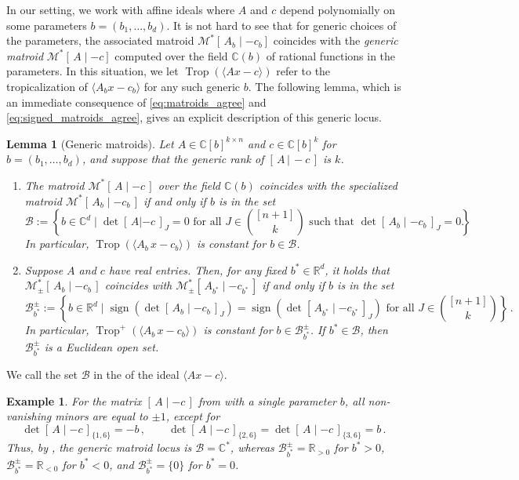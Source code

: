 \documentclass[11pt,reqno,a4paper]{amsart}
\numberwithin{equation}{section}
\theoremstyle{theoremstyle}
\newtheorem{lemma}[theorem]{Lemma}
\theoremstyle{examplestyle}
\newtheorem{example}[theorem]{Example}
\newcommand{\CC}{\mathbb{C}}
\newcommand{\RR}{\mathbb{R}}
\DeclareMathOperator{\Trop}{Trop}
\DeclareMathOperator{\sgn}{sign}
\newcommand{\term}{\bfemph}
\begin{document}
In our setting, we work with affine ideals where  $A$ and $c$ depend polynomially on some parameters $b=(b_1,\ldots,b_d)$. It is not hard to see that for generic choices of the parameters, the associated matroid $\mathcal{M}^*[\,A_b\mid -c_b]$ coincides with the \emph{generic matroid} $\mathcal{M}^*[\,A\mid -c]$ computed over the field $\CC(b)$ of rational functions in the parameters. 
In this situation, we let $\Trop(\langle Ax-c\rangle)$  refer to the tropicalization of $\langle A_bx-c_b\rangle$ for any such generic $b$. 
The following lemma, which is an immediate consequence of \eqref{eq:matroids_agree} and \eqref{eq:signed_matroids_agree}, gives an explicit description of this generic locus.


 
\begin{lemma}[Generic matroids]
\label{lem:genericMatroid}
Let $A\in \CC[b]^{k\times n}$ and $c\in\CC[b]^k$ for   $b=(b_1,\ldots, b_d)$, and suppose that the generic rank of $[\,A\,|\, -c\,]$ is $k$. 
\begin{enumerate}[label=(\roman*)]
    \item The matroid $\mathcal{M}^*[\,A\mid -c\,]$ over the field $\CC(b)$ coincides with the specialized matroid $\mathcal{M}^*[\,A_b\mid -c_b\,]$ if and only if $b$ is in the set
     \[ \mathcal{B}:= \left\{b\in\CC^d\mid \det [\,A| -c\,]_{J} = 0 \text{ for all $J\in\textstyle\binom{[n+1]}{k}$ such that } \det[\,A_b\mid -c_b\,]_{J} = 0 \right\}. \]
    In particular, $\Trop(\langle A_b\, x-c_b\rangle)$ is constant for $b\in \mathcal{B}$. 
    \item
    Suppose $A$ and $c$ have real entries. Then, for any fixed $b^*\in \RR^d$, it holds that $\mathcal{M}^*_{\pm}[\,A_b\mid -c_b\,]$ coincides with $\mathcal{M}^*_{\pm}[\,A_{b^*}\mid -c_{b^*}\,]$ if and only if $b$ is in the set
    \[ \mathcal{B}_{b^*}^{\pm}:= \left\{b\in\RR^d\mid \sgn(\det[\,A_b\mid -c_b\,]_{J})=\sgn(\det[\,A_{b^*}\mid -c_{b^*}\,]_{J}) \text{ for all }J\in\textstyle\binom{[n+1]}{k}\right\}\, . \]
    In particular, $\Trop^+(\langle A_b\, x-c_b\rangle)$ is constant for $b\in \mathcal{B}_{b^*}^{\pm}$. 
    If $b^*\in \mathcal{B}$, then $\mathcal{B}_{b^*}^{\pm}$ is a Euclidean open set.
\end{enumerate}
\end{lemma}


We call the set $\mathcal{B}$ in  the \term{generic matroid locus} of the ideal $\langle A x - c \rangle$.

\begin{example}
For the matrix $[\,A \mid -c\,]$ from  with a single parameter $b$, all non-vanishing minors  are equal to $\pm 1$, except for 
\[
 \det[\,A \mid -c\,]_{\{1,6\}} = -b\, ,  \qquad    \det[\,A \mid -c\,]_{\{2,6\}}   =  \det[\,A \mid -c\,]_{\{3,6\}} = b   \, .\]
Thus, by , the generic matroid locus is $\mathcal{B}=\CC^*$, whereas
$\mathcal{B}_{b^*}^{\pm}=\RR_{>0}$ for $b^*>0$, $\mathcal{B}_{b^*}^{\pm}=\RR_{<0}$ for $b^*<0$,  
and $\mathcal{B}_{b^*}^{\pm}=\{0\}$ for $b^*=0$.
\end{example}
\end{document}
